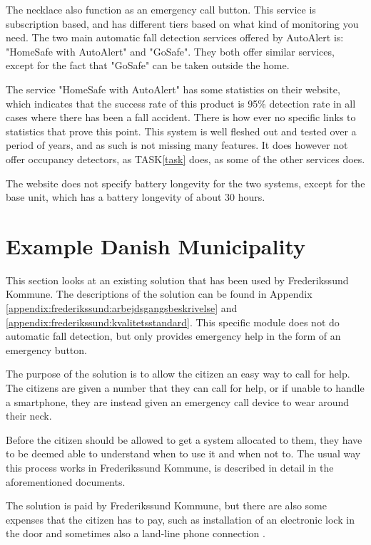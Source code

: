 The necklace also function as an emergency call button. This service is subscription based, and has different tiers based on what kind of monitoring you need. The two main automatic fall detection services offered by AutoAlert is: "HomeSafe with AutoAlert" and "GoSafe". They both offer similar services, except for the fact that "GoSafe" can be taken outside the home. 

The service "HomeSafe with AutoAlert" has some statistics on their website, which indicates that the success rate of this product is 95\% \cite{AAlert:homesafe} detection rate in all cases where there has been a fall accident. There is how ever no specific links to statistics that prove this point. This system is well fleshed out and tested over a period of years, and as such is not missing many features. It does however not offer occupancy detectors, as TASK\ref{task} does, as some of the other services does.

The website does not specify battery longevity for the two systems, except for the base unit, which has a battery longevity of about 30 hours.

\section{Example Danish Municipality}
This section looks at an existing solution that has been used by Frederikssund Kommune. The descriptions of the solution can be found in Appendix \ref{appendix:frederikssund:arbejdsgangsbeskrivelse} and \ref{appendix:frederikssund:kvalitetsstandard}. This specific module does not do automatic fall detection, but only provides emergency help in the form of an emergency button.

The purpose of the solution is to allow the citizen an easy way to call for help. The citizens are given a number that they can call for help, or if unable to handle a smartphone, they are instead given an emergency call device to wear around their neck.

Before the citizen should be allowed to get a system allocated to them, they have to be deemed able to understand when to use it and when not to. The usual way this process works in Frederikssund Kommune, is described in detail in the aforementioned documents.

The solution is paid by Frederikssund Kommune, but there are also some expenses that the citizen has to pay, such as installation of an electronic lock in the door and sometimes also a land-line phone connection \cite{frederikssund:arbejdesbeskrivelse} \cite{frederikssund:kvalitetsstandard}.

